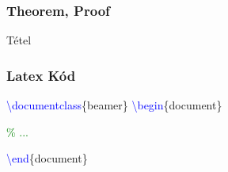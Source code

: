 \documentclass[aspectratio=169, 12pt]{beamer}
\begin{document}
\begin{frame}
  \frametitle{Theorem, Proof}
  \begin{theorem}
    Tétel
  \end{theorem}
	
\end{frame}

\begin{frame}[fragile]
  \frametitle{Latex Kód}
  \begin{semiverbatim}
    \textcolor{blue}{\textbackslash documentclass}\{beamer\}
    \textcolor{blue}{\textbackslash begin}\{document\}

    \textcolor{green}{\% ...}

    \textcolor{blue}{\textbackslash end}\{document\}
  \end{semiverbatim}
\end{frame}
\end{document}
